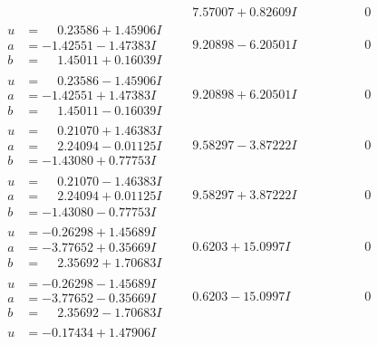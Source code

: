 \documentclass[1p]{elsarticle_modified}
\theoremstyle{definition}
\begin{document}
$$\begin{array}{c|c|c}
 & \phantom{-}7.57007 + 0.82609 I & \phantom{-0.000000 } 0 \\ \hline\begin{aligned}
u &= \phantom{-}0.23586 + 1.45906 I \\
a &= -1.42551 - 1.47383 I \\
b &= \phantom{-}1.45011 + 0.16039 I\end{aligned}
 & \phantom{-}9.20898 - 6.20501 I & \phantom{-0.000000 } 0 \\ \hline\begin{aligned}
u &= \phantom{-}0.23586 - 1.45906 I \\
a &= -1.42551 + 1.47383 I \\
b &= \phantom{-}1.45011 - 0.16039 I\end{aligned}
 & \phantom{-}9.20898 + 6.20501 I & \phantom{-0.000000 } 0 \\ \hline\begin{aligned}
u &= \phantom{-}0.21070 + 1.46383 I \\
a &= \phantom{-}2.24094 - 0.01125 I \\
b &= -1.43080 + 0.77753 I\end{aligned}
 & \phantom{-}9.58297 - 3.87222 I & \phantom{-0.000000 } 0 \\ \hline\begin{aligned}
u &= \phantom{-}0.21070 - 1.46383 I \\
a &= \phantom{-}2.24094 + 0.01125 I \\
b &= -1.43080 - 0.77753 I\end{aligned}
 & \phantom{-}9.58297 + 3.87222 I & \phantom{-0.000000 } 0 \\ \hline\begin{aligned}
u &= -0.26298 + 1.45689 I \\
a &= -3.77652 + 0.35669 I \\
b &= \phantom{-}2.35692 + 1.70683 I\end{aligned}
 & \phantom{-}0.6203 + 15.0997 I & \phantom{-0.000000 } 0 \\ \hline\begin{aligned}
u &= -0.26298 - 1.45689 I \\
a &= -3.77652 - 0.35669 I \\
b &= \phantom{-}2.35692 - 1.70683 I\end{aligned}
 & \phantom{-}0.6203 - 15.0997 I & \phantom{-0.000000 } 0 \\ \hline\begin{aligned}
u &= -0.17434 + 1.47906 I \\

\end{aligned}
\end{array}$$
\end{document}
